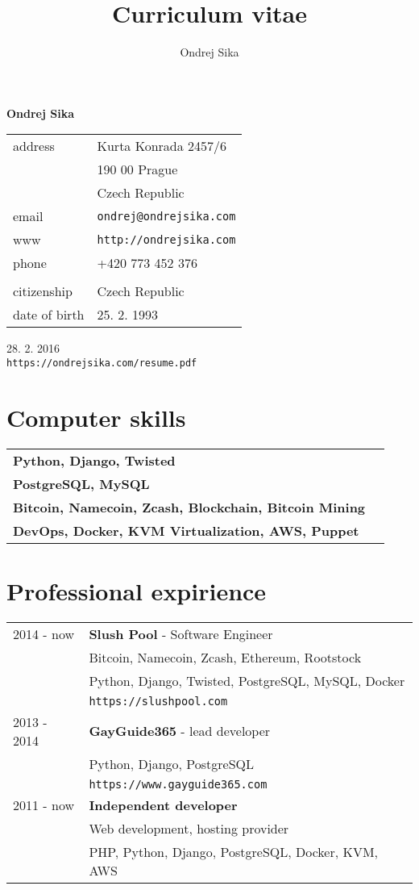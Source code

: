 \documentclass[12pt,a4paper]{article}
\title{Curriculum vitae}
\author{Ondrej Sika}
\begin{document}
\begin{center}
{\LARGE \bf Ondrej Sika}\\
\vspace*{0.2cm}
\begin{tabular}{R{5cm}L{5cm}}
address & Kurta Konrada 2457/6\\
 & 190 00 Prague\\
 & Czech Republic\\
email & \texttt{ondrej@ondrejsika.com}\\
www & \texttt{http://ondrejsika.com}\\
phone & +420 773 452 376\\
\\
citizenship & Czech Republic\\
date of birth & 25. 2. 1993\\
\end{tabular}

\vspace*{0.3cm}
{\hfill 28. 2. 2016}\\
{\hfill \texttt{https://ondrejsika.com/resume.pdf}}
\end{center}

\section*{Computer skills}
\begin{tabular}{@{}ll}
{\bf Python, Django, Twisted} & \\
{\bf PostgreSQL, MySQL} & \\
{\bf Bitcoin, Namecoin, Zcash, Blockchain, Bitcoin Mining} & \\
{\bf DevOps, Docker, KVM Virtualization, AWS, Puppet} & \\
\end{tabular}

\section*{Professional expirience}
\begin{tabular}{@{}p{2cm}l}
2014 - now & {\bf Slush Pool} - Software Engineer\\
 & Bitcoin, Namecoin, Zcash, Ethereum, Rootstock\\
 & Python, Django, Twisted, PostgreSQL, MySQL, Docker\\
 & \texttt{https://slushpool.com}\\
2013 - 2014 & {\bf GayGuide365} - lead developer\\
 & Python, Django, PostgreSQL\\
 & \texttt{https://www.gayguide365.com}\\
2011 - now & {\bf Independent developer}\\
    & Web development, hosting provider\\
    & PHP, Python, Django, PostgreSQL, Docker, KVM, AWS\\
\end{tabular}
\end{document}
